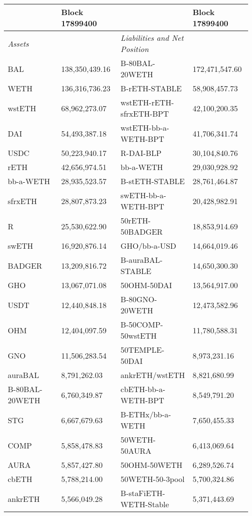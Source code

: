 
\begin{longtable}{@{}p{0.25\linewidth}p{0.25\linewidth}p{0.25\linewidth}p{0.25\linewidth}@{}}

\toprule


& Block 17899400 & & Block 17899400 \\

\midrule
\textit{Assets} & & \textit{Liabilities and Net Position} \\
BAL & 138,350,439.16 & B-80BAL-20WETH & 172,471,547.60 \\
WETH & 136,316,736.23 & B-rETH-STABLE & 58,908,457.73 \\
wstETH & 68,962,273.07 & wstETH-rETH-sfrxETH-BPT & 42,100,200.35 \\
DAI & 54,493,387.18 & wstETH-bb-a-WETH-BPT & 41,706,341.74 \\
USDC & 50,223,940.17 & R-DAI-BLP & 30,104,840.76 \\
rETH & 42,656,974.51 & bb-a-WETH & 29,030,928.92 \\
bb-a-WETH & 28,935,523.57 & B-stETH-STABLE & 28,761,464.87 \\
sfrxETH & 28,807,873.23 & swETH-bb-a-WETH-BPT & 20,428,982.91 \\
R & 25,530,622.90 & 50rETH-50BADGER & 18,853,914.69 \\
swETH & 16,920,876.14 & GHO/bb-a-USD & 14,664,019.46 \\
BADGER & 13,209,816.72 & B-auraBAL-STABLE & 14,650,300.30 \\
GHO & 13,067,071.08 & 50OHM-50DAI & 13,564,917.00 \\
USDT & 12,440,848.18 & B-80GNO-20WETH & 12,473,582.96 \\
OHM & 12,404,097.59 & B-50COMP-50wstETH & 11,780,588.31 \\
GNO & 11,506,283.54 & 50TEMPLE-50DAI & 8,973,231.16 \\
auraBAL & 8,791,262.03 & ankrETH/wstETH & 8,821,680.99 \\
B-80BAL-20WETH & 6,760,349.87 & cbETH-bb-a-WETH-BPT & 8,549,791.20 \\
STG & 6,667,679.63 & B-ETHx/bb-a-WETH  & 7,650,455.33 \\
COMP & 5,858,478.83 & 50WETH-50AURA & 6,413,069.64 \\
AURA & 5,857,427.80 & 50OHM-50WETH & 6,289,526.74 \\
cbETH & 5,788,214.00 & 50WETH-50-3pool & 5,700,324.86 \\
ankrETH & 5,566,049.28 & B-staFiETH-WETH-Stable & 5,371,443.69 \\

\end{longtable}
